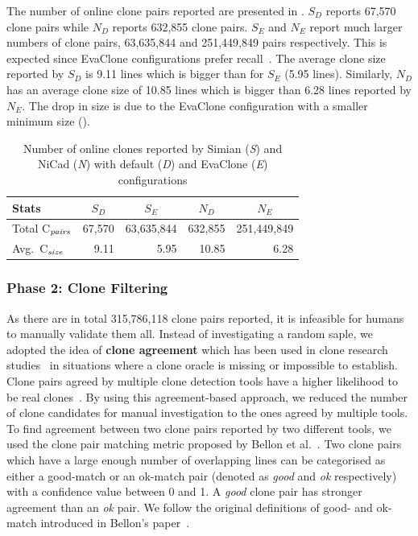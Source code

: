 \documentclass[sigconf,review, anonymous]{acmart}
\begin{document}
The number of online clone pairs reported %
are presented in . $S_D$ reports 67,570 clone
pairs while $N_D$ reports 632,855 clone pairs. $S_E$ and $N_E$ report
much larger numbers of clone pairs, 63,635,844 and 251,449,849 pairs
respectively. This is expected since EvaClone configurations prefer
recall~\cite{Wang2013}.  The average clone size reported by $S_D$ is
9.11 lines which is bigger than for $S_E$ (5.95 lines). Similarly,
$N_D$ has an average clone size of 10.85 lines which is bigger than
6.28 lines reported by $N_E$. The drop in size is due to the EvaClone
configuration with a smaller minimum size ().

\begin{table}
	\centering
	\caption{Number of online clones reported by Simian (\textit{S}) and NiCad (\textit{N}) with default (\textit{D}) and EvaClone (\textit{E}) configurations}
	\label{tab:orig_stats}
	\begin{tabular}{l|r|r|r|r}
		\hline
		Stats & \multicolumn{1}{c|}{$S_D$} & \multicolumn{1}{c|}{$S_E$} & \multicolumn{1}{c|}{$N_D$} & \multicolumn{1}{c}{$N_E$} \\
		\hline
		Total C$_{\textrm{\textit{pairs}}}$ & 67,570 & 63,635,844 & 632,855 & 251,449,849 \\
		Avg.~C$_{\textrm{\textit{size}}}$ & 9.11 & 5.95 & 10.85 & 6.28 \\
		\hline
	\end{tabular} %
\end{table}

\subsubsection{Phase 2: Clone Filtering}
As there are in total 315,786,118 clone pairs reported, it is
infeasible for humans to manually validate them all. Instead of
investigating a random saple, we adopted the idea of \textbf{clone
  agreement} which has been used in clone research
studies~\cite{Funaro2010, Wang2013,cr2016ssbse} in situations where a
clone oracle is missing or impossible to establish. Clone pairs agreed
by multiple clone detection tools have a higher likelihood to be real
clones~\cite{cr2016ssbse}. By using this agreement-based approach, we
reduced the number of clone candidates for manual investigation to the
ones agreed by multiple tools. To find agreement between two clone
pairs reported by two different tools, we used the clone pair matching
metric proposed by Bellon et al.~\cite{Bellon2007}. Two clone pairs
which have a large enough number of overlapping lines can be
categorised as either a good-match or an ok-match pair (denoted as
\textit{good} and \textit{ok} respectively) with a confidence value
between 0 and 1. A \textit{good} clone pair has stronger agreement
than an \textit{ok} pair. We follow the original definitions of good-
and ok-match introduced in Bellon's paper~\cite{Bellon2007}.
\end{document}
